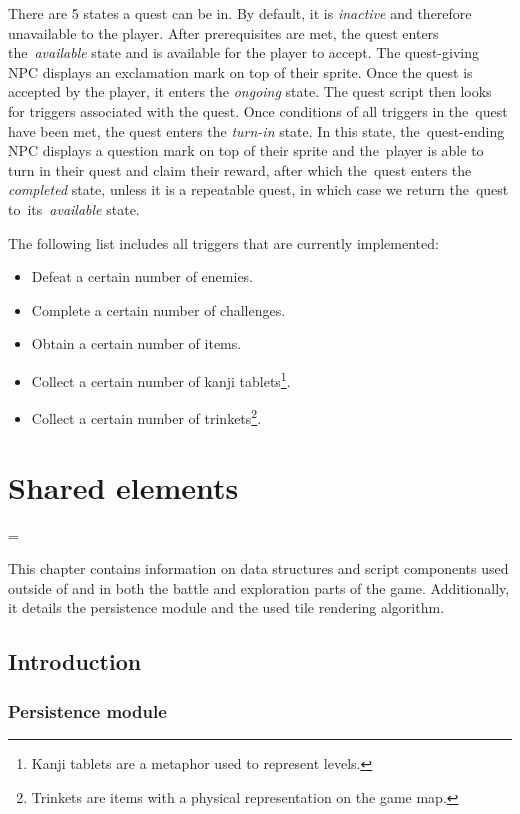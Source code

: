 \documentclass[thesis=B,english,hidelinks]{FITthesisXE}[2012/06/26]
\begin{document}
There are 5 states a quest can be in. By default, it is \emph{inactive} and therefore unavailable to the player. After prerequisites are met, the quest enters the~\emph{available} state and is available for the player to accept. The quest-giving NPC displays an exclamation mark on top of their sprite. Once the quest is accepted by the player, it enters the \emph{ongoing} state. The quest script then looks for triggers associated with the quest. Once conditions of all triggers in the~quest have been met, the quest enters the \emph{turn-in} state. In this state, the~quest-ending NPC displays a question mark on top of their sprite and the~player is able to turn in their quest and claim their reward, after which the~quest enters the \emph{completed} state, unless it is a repeatable quest, in which case we return the~quest to~its~\emph{available} state.

The following list includes all triggers that are currently implemented:

\begin{itemize}
\item Defeat a certain number of enemies.
\item Complete a certain number of challenges.
\item Obtain a certain number of items.
\item Collect a certain number of kanji tablets\footnote{Kanji tablets are a metaphor used to represent levels.}.
\item Collect a certain number of trinkets\footnote{Trinkets are items with a physical representation on the game map.}.
\end{itemize}

\chapter{Shared elements}

\emergencystretch=\maxdimen
{}

This chapter contains information on data structures and script components used outside of and in both the battle and exploration parts of the game. Additionally, it details the persistence module and the used tile rendering algorithm.

\section{Introduction}

\subsection{Persistence module}
\end{document}
